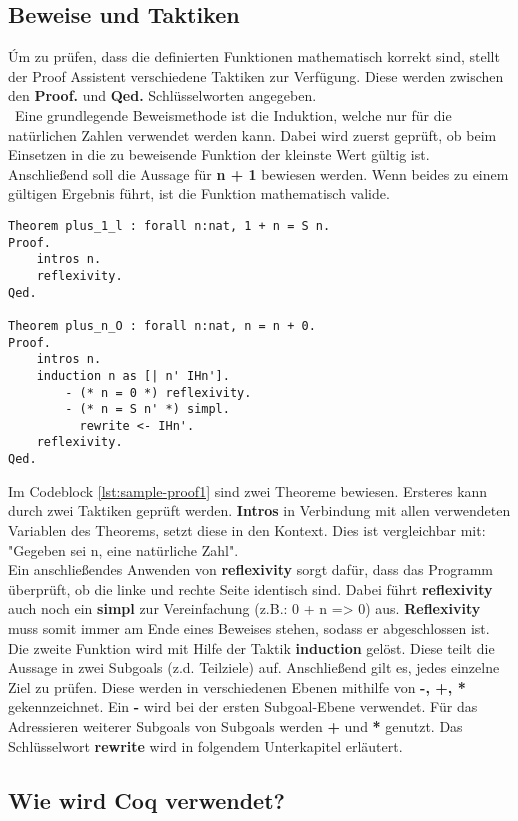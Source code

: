 \subsection{Beweise und Taktiken}
Úm zu prüfen, dass die definierten Funktionen mathematisch korrekt sind, stellt der Proof Assistent verschiedene Taktiken zur Verfügung. Diese werden zwischen den \textbf{Proof.} und \textbf{Qed.} Schlüsselworten angegeben.\\\
Eine grundlegende Beweismethode ist die Induktion, welche nur für die natürlichen Zahlen verwendet werden kann. Dabei wird zuerst geprüft, ob beim Einsetzen in die zu beweisende Funktion der kleinste Wert gültig ist. Anschließend soll die Aussage für \textbf{n + 1} bewiesen werden. Wenn beides zu einem gültigen Ergebnis führt, ist die Funktion mathematisch valide.
\begin{lstlisting}[language=coq,firstnumber=1,caption=Coq Beispielbeweis,label=lst:sample-proof1]
Theorem plus_1_l : forall n:nat, 1 + n = S n.
Proof.
	intros n. 
	reflexivity. 
Qed.

Theorem plus_n_O : forall n:nat, n = n + 0.
Proof.
	intros n. 
	induction n as [| n' IHn'].
		- (* n = 0 *) reflexivity.
		- (* n = S n' *) simpl.
		  rewrite <- IHn'.
	reflexivity.
Qed.
\end{lstlisting}
Im Codeblock \ref{lst:sample-proof1} sind zwei Theoreme bewiesen. Ersteres kann durch zwei Taktiken geprüft werden. \textbf{Intros} in Verbindung mit allen verwendeten Variablen des Theorems, setzt diese in den Kontext. Dies ist vergleichbar mit: "Gegeben sei n, eine natürliche Zahl".\\
Ein anschließendes Anwenden von \textbf{reflexivity} sorgt dafür, dass das Programm überprüft, ob die linke und rechte Seite identisch sind. Dabei führt \textbf{reflexivity} auch noch ein \textbf{simpl} zur Vereinfachung (z.B.: 0 + n => 0) aus. \textbf{Reflexivity} muss somit immer am Ende eines Beweises stehen, sodass er abgeschlossen ist.\\
Die zweite Funktion wird mit Hilfe der Taktik \textbf{induction} gelöst. Diese teilt die Aussage in zwei Subgoals (z.d. Teilziele) auf. Anschließend gilt es, jedes einzelne Ziel zu prüfen. Diese werden in verschiedenen Ebenen mithilfe von \textbf{-, +, *} gekennzeichnet. Ein \textbf{-} wird bei der ersten Subgoal-Ebene verwendet. Für das Adressieren weiterer Subgoals von Subgoals werden \textbf{+} und \textbf{*} genutzt. Das Schlüsselwort \textbf{rewrite} wird in folgendem Unterkapitel erläutert. 
\subsection{Wie wird Coq verwendet?}

